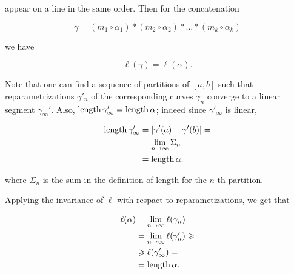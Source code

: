 appear on a line in the same order.
Then for the concatenation 

\[\gamma=(m_1\circ\alpha_1)*(m_2\circ\alpha_2)*\dots*(m_k\circ\alpha_k)\]

we have

\[\ell(\gamma)=\ell(\alpha).\]



Note that one can find a sequence of partitions of $[a,b]$ such that reparametrizations $\gamma'_n$ of 
the corresponding curves $\gamma_n$ converge to a linear segment $\gamma_\infty'$. 
Also, $\mathop{\rm length}\nolimits\gamma'_\infty=\mathop{\rm length}\nolimits\alpha$;
indeed since $\gamma'_\infty$ is linear,

\begin{align*}
\mathop{\rm length}\nolimits \gamma'_\infty&=|\gamma'(a)-\gamma'(b)|=
\\
&=\lim_{n\to\infty}\Sigma_n=
\\
&=\mathop{\rm length}\nolimits\alpha.
\end{align*}

where $\Sigma_n$ is the sum in the definition of length for the $n$-th partition.



Applying the invariance of $\ell$ with respact to reparametizations, we get that

\begin{align*}
\ell(\alpha)&=\lim_{n\to\infty}\ell(\gamma_n)=
\\
&=\lim_{n\to\infty}\ell(\gamma_n')\geqslant
\\
&\geqslant \ell(\gamma_\infty')=
\\
&=\mathop{\rm length}\nolimits\alpha.
\end{align*}

\qedsf

